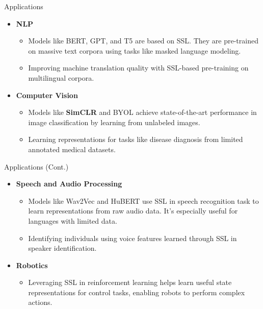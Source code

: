 \documentclass[serif, aspectratio=169]{beamer}
\begin{document}
\begin{frame}{Applications}
    \begin{itemize}
        \item \textbf{NLP}
        \begin{itemize}
            \item Models like BERT, GPT, and T5 are based on SSL. They are pre-trained on massive text corpora using tasks like masked language modeling.
            \item Improving machine translation quality with SSL-based pre-training on multilingual corpora. 
        \end{itemize}

        \item \textbf{Computer Vision}
        \begin{itemize}
            \item Models like \textbf{SimCLR} and BYOL achieve state-of-the-art performance in image classification by learning from unlabeled images.
            \item Learning representations for tasks like disease diagnosis from limited annotated medical datasets.
        \end{itemize}
    \end{itemize}
\end{frame}


\begin{frame}{Applications (Cont.)}
    \begin{itemize}
        \item \textbf{Speech and Audio Processing}
        \begin{itemize}
            \item Models like Wav2Vec and HuBERT use SSL in speech recognition task to learn representations from raw audio data. It's especially useful for languages with limited data.
            \item Identifying individuals using voice features learned through SSL in speaker identification.
        \end{itemize}

        \item \textbf{Robotics}
        \begin{itemize}
            \item Leveraging SSL in reinforcement learning helps learn useful state representations for control tasks, enabling robots to perform complex actions.
        \end{itemize}
    \end{itemize}
\end{frame}
\end{document}
